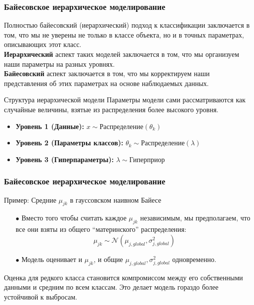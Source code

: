 \documentclass[notheorems, handout]{beamer}
\begin{document}
\begin{frame}
  \frametitle{Байесовское иерархическое моделирование}
Полностью байесовский (иерархический) подход к классификации заключается в том, что мы не уверены не только в классе объекта, но и в точных параметрах, описывающих этот класс.\\
\textbf{Иерархический} аспект таких моделей заключается в том, что мы организуем наши параметры на разных уровнях.\\ \textbf{Байесовский} аспект заключается в том, что мы корректируем наши представления об этих параметрах на основе наблюдаемых данных.
  
  \begin{block}{Структура иерархической модели}
    Параметры модели сами рассматриваются как случайные величины, взятые из распределения более высокого уровня.
    \begin{itemize}
        \item \textbf{Уровень 1 (Данные):} $x \sim \text{Распределение}(\theta_k)$
        \item \textbf{Уровень 2 (Параметры классов):} $\theta_k \sim \text{Распределение}(\lambda)$
        \item \textbf{Уровень 3 (Гиперпараметры):} $\lambda \sim \text{Гиперприор}$
    \end{itemize}
  \end{block}
  

  
\end{frame}
\begin{frame}
  \frametitle{Байесовское иерархическое моделирование}
   \begin{block}{Пример: Средние $\mu_{jk}$ в гауссовском наивном Байесе}
  \begin{itemize}
    \item[$\bullet$] Вместо того чтобы считать каждое $\mu_{jk}$ независимым, мы предполагаем, что все они взяты из общего ``материнского'' распределения:
    $$ \mu_{jk} \sim \mathcal{N}(\mu_{j, global}, \sigma^2_{j, global}) $$
    \item[$\bullet$] Модель оценивает и $\mu_{jk}$, и общие $\mu_{j, global}, \sigma^2_{j, global}$ одновременно.
  \end{itemize}
  \end{block}
    Оценка для редкого класса становится компромиссом между его собственными данными и средним по всем классам. Это делает модель гораздо более устойчивой к выбросам.
  
\end{frame}
\end{document}
